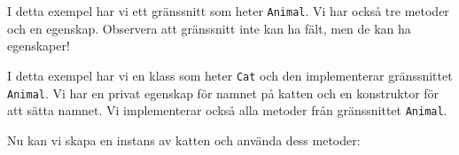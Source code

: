 I detta exempel har vi ett gränssnitt som heter \texttt{Animal}. Vi har
också tre metoder och en egenskap. Observera att gränssnitt inte kan ha
fält, men de kan ha egenskaper!

\hypertarget{cb2}{}
\begin{Shaded}
\begin{Highlighting}[]
\OperatorTok{\{}
 \OperatorTok{;}

 \OperatorTok{(}\OperatorTok{)} \OperatorTok{\{}
 \OperatorTok{=}\OperatorTok{;}
\OperatorTok{\}}

  \OperatorTok{()} \OperatorTok{\{}
\OperatorTok{;}
\OperatorTok{\}}

  \OperatorTok{()} \OperatorTok{\{}
\OperatorTok{(}\OperatorTok{+} \OperatorTok{);}
\OperatorTok{\}}

  \OperatorTok{()} \OperatorTok{\{}
\OperatorTok{(}\OperatorTok{+} \OperatorTok{);}
\OperatorTok{\}}

  \OperatorTok{()} \OperatorTok{\{}
\OperatorTok{(}\OperatorTok{+} \OperatorTok{);}
\OperatorTok{\}}
\OperatorTok{\}}
\end{Highlighting}
\end{Shaded}

I detta exempel har vi en klass som heter \texttt{Cat} och den
implementerar gränssnittet \texttt{Animal}. Vi har en privat egenskap
för namnet på katten och en konstruktor för att sätta namnet. Vi
implementerar också alla metoder från gränssnittet \texttt{Animal}.

Nu kan vi skapa en instans av katten och använda dess metoder:


